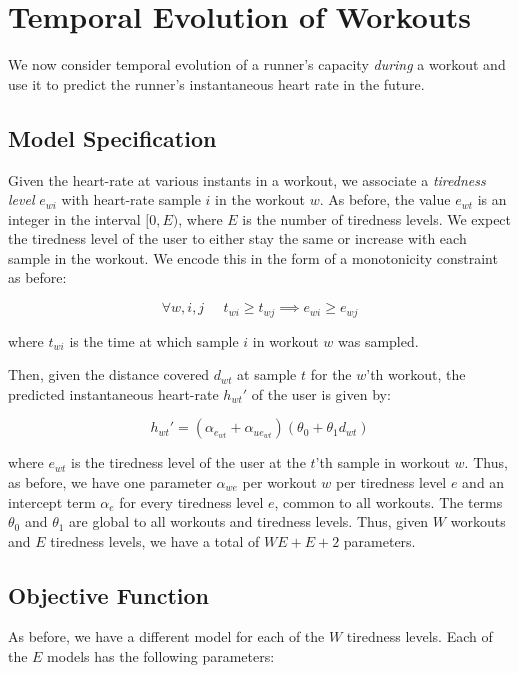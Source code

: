 \documentclass{acm_proc_article-sp}
\begin{document}
\section{Temporal Evolution of Workouts}
\label{secTemporalModelWorkouts}
We now consider temporal evolution of a runner's capacity \emph{during} a workout and use it to predict the runner's instantaneous heart rate in the future. 

\subsection{Model Specification}

Given the heart-rate at various instants in a workout, we associate a \emph{tiredness level} $e_{wi}$ with heart-rate sample $i$ in the workout $w$. As before, the value $e_{wt}$ is an integer in the interval $[0, E)$, where $E$ is the number of tiredness levels. We expect the tiredness level of the user to either stay the same or increase with each sample in the workout. We encode this in the form of a monotonicity constraint as before:

$$\forall w,i,j \;\;\;\;\; t_{wi} \geq t_{wj} \implies e_{wi} \geq e_{wj}$$

where $t_{wi}$ is the time at which sample $i$ in workout $w$ was sampled.

Then, given the distance covered $d_{wt}$ at sample $t$ for the $w$'th workout, the predicted instantaneous heart-rate $h_{wt}'$ of the user is given by:

\begin{equation}
\label{eqnModelInstHr}
h_{wt}' = (\alpha_{e_{wt}} + \alpha_{ue_{wt}})(\theta_0 + \theta_1 d_{wt})
\end{equation}

where $e_{wt}$ is the tiredness level of the user at the $t$'th sample in workout $w$. Thus, as before, we have one parameter $\alpha_{we}$ per workout $w$ per tiredness level $e$ and an intercept term $\alpha_e$ for every tiredness level $e$, common to all workouts. The terms $\theta_0$ and $\theta_1$ are global to all workouts and tiredness levels. Thus, given $W$ workouts and $E$ tiredness levels, we have a total of $WE + E + 2$ parameters.

\subsection{Objective Function}
As before, we have a different model for each of the $W$ tiredness levels. Each of the $E$ models has the following parameters:
\end{document}
